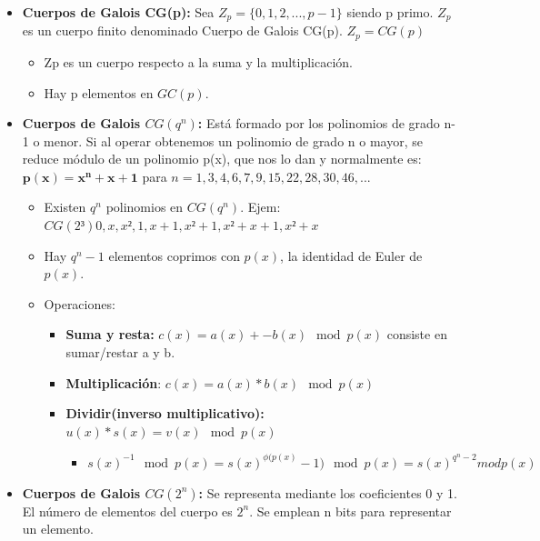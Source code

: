 \documentclass[12pt, twoside, openright]{report} %
\begin{document}
\begin{itemize}
\begin{itemize}
    \end{itemize}
  \item \textbf{Cuerpos de Galois CG(p):} Sea $Z_p=\{0, 1, 2,..., p-1\}$ siendo
    p primo. $Z_p$ es un cuerpo finito denominado Cuerpo de Galois CG(p).
    $Z_p=CG(p)$
    

    \begin{itemize}
    \item Zp es un cuerpo respecto a la suma y la multiplicación.
      
    \item Hay p elementos en $GC(p)$.
      
    \end{itemize}
  \item \textbf{Cuerpos de Galois $CG(q^n)$:} Está formado por los
    polinomios de grado n-1 o menor. Si al operar obtenemos un polinomio
    de grado n o mayor, se reduce módulo de un polinomio p(x), que nos
    lo dan y normalmente es: $\boldsymbol{p(x)=x^n+x+1}$ para $n= 1, 3, 4, 6, 7, 9, 15, 22, 28, 30, 46,...$
    

    \begin{itemize}
    \item Existen $q^n$ polinomios en $CG(q^n)$. Ejem: $CG(2³) 0, x, x², 1, x+1, x²+1, x²+x+1, x²+x$
      
    \item Hay $q^n -1$ elementos coprimos con $p(x)$, la identidad de Euler
      de $p(x)$.
      
    \item Operaciones:
      

      \begin{itemize}
      \item \textbf{Suma y resta:} $c(x)=a(x)+-b(x) \mod p(x)$ consiste en
        sumar/restar a y b.
        
      \item \textbf{Multiplicación}: $c(x)=a(x)*b(x) \mod p(x)$
        
      \item \textbf{Dividir(inverso multiplicativo):} $u(x)*s(x)=v(x) \mod p(x)$
        

        \begin{itemize}
        \item $s(x)^{-1} \mod p(x) = s(x)^{\phi(p(x)} -1) \mod p(x) = s(x)^{q^n -2} mod p(x)$
          
        \end{itemize}
      \end{itemize}
    \end{itemize}
  \item \textbf{Cuerpos de Galois $CG(2^n)$:} Se representa mediante los
    coeficientes 0 y 1. El número de elementos del cuerpo es $2^n$. Se
    emplean n bits para representar un elemento.
    


\end{itemize}
\end{document}
